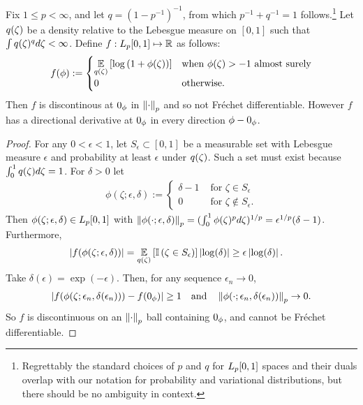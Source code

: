 \begin{lem}


Fix $1 \le p < \infty$, and let $q = (1 - p^{-1})^{-1}$, from which $p^{-1} +
q^{-1}=1$ follows.\footnote{Regrettably the standard choices of $p$ and $q$ for
${L_{p}[0,1]}$ spaces and their duals overlap with our notation for probability and
variational distributions, but there should be no ambiguity in context.}  Let
$q(\zeta)$ be a density relative to the Lebesgue measure on $[0,1]$ such that
$\int q(\zeta)^q d\zeta < \infty$. Define $f: {L_{p}[0,1]} \mapsto \mathbb{R}$ as
follows:
%
\begin{align*}
%
f(\phi) :=
\begin{cases}
    \expect{\q(\zeta)}{\log \left(1 + \phi(\zeta)\right)} &
    \textrm{when }\phi(\zeta) > -1\textrm{ almost surely} \\
    0 & \textrm{otherwise}.
%
\end{cases}
%
\end{align*}
%
Then $f$ is discontinous at $0_\phi$ in $\left\Vert\cdot\right\Vert_p$ and so not Fr{\'e}chet
differentiable.  However $f$ has a directional derivative at $0_\phi$ in every
direction $\phi - 0_\phi$.

\begin{proof}
%
For any $0 < \epsilon < 1$, let $S_\epsilon \subset [0, 1]$ be a measurable set
with Lebesgue measure $\epsilon$ and probability at least $\epsilon$ under
$q(\zeta)$.  Such a set must exist because $\int_0^1 q(\zeta) d\zeta = 1$. For
$\delta > 0$ let
%
\begin{align*}
%
\phi(\zeta; \epsilon, \delta) :=
\begin{cases}
    \delta - 1      & \textrm{ for }\zeta\in S_\epsilon \\
    0      & \textrm{ for }\zeta\notin S_\epsilon.
\end{cases}
%
\end{align*}
%
Then $\phi(\zeta; \epsilon, \delta) \in {L_{p}[0,1]}$ with $\left\Vert\phi(\cdot;
\epsilon, \delta)\right\Vert_p = (\int_0^1 \phi(\zeta)^p d\zeta)^{1/p} =\epsilon^{1/p}
(\delta - 1)$.  Furthermore,
%
\begin{align*}
%
\abs{f(\phi(\zeta; \epsilon, \delta))} ={}&
    \expect{\q(\zeta)}{\ind{\zeta \in S_\epsilon}} \abs{\log(\delta)} \ge
    \epsilon \abs{\log(\delta)}.
%
\end{align*}
Take $\delta(\epsilon) = \exp(-\epsilon)$.  Then, for any sequence $\epsilon_n
\rightarrow 0$,
%
\begin{align*}
%
\abs{f(\phi(\zeta; \epsilon_n, \delta(\epsilon_n))) - f(\phiz)} \ge{} 1
\mathtxt{and}
\norm{\phi(\cdot; \epsilon_n, \delta(\epsilon_n))}_p \rightarrow{} 0.
%
\end{align*}
%
So $f$ is discontinuous on an $\left\Vert\cdot\right\Vert_p$ ball containing $0_\phi$, and
cannot be Fr{\'e}chet differentiable.


\end{proof}
\end{lem}
